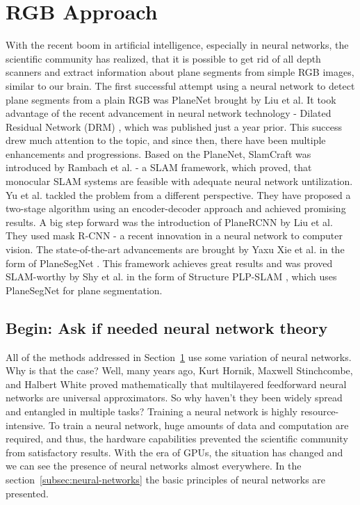 \begin{enumerate}
\end{enumerate}

\section{RGB Approach} \label{sec:rgb-approach}

With the recent boom in artificial intelligence,
especially in neural networks, the scientific community has realized,
that it is possible to get rid of all depth scanners
and extract information about plane segments from simple RGB images, similar to our brain.
The first successful attempt using a neural network to detect plane segments from a plain RGB was
PlaneNet brought by Liu et al. \cite{articlePlaneNet}
It took advantage of the recent advancement
in neural network technology - Dilated Residual Network (DRM) \cite{inproceedingsDetailedResidualNetworks},
which was published just a year prior.
This success drew much attention to the topic, and since then, there have been multiple enhancements and progressions.
Based on the PlaneNet, SlamCraft was introduced by Rambach et al. \cite{inproceedingsSlamCraft} - a SLAM framework,
which proved, that monocular SLAM systems are feasible with adequate neural network untilization.
Yu et al. \cite{inproceedingsEncoderDecoderApproach} tackled the problem from a different perspective.
They have proposed a two-stage algorithm using an encoder-decoder approach and achieved promising results.
A big step forward was the introduction of PlaneRCNN by Liu et al. \cite{articlePlaneRCNN}
They used mask R-CNN \cite{inproceedingsMaskRCNN} - a recent innovation in a neural network to computer vision.
The state-of-the-art advancements are brought by Yaxu Xie et al. in the form of PlaneSegNet \cite{inproceedingsPlaneSegNet}.
This framework achieves great results and was proved SLAM-worthy by
Shy et al. in the form of Structure PLP-SLAM \cite{inproceedingsPLPSLAM}, which uses PlaneSegNet for plane segmentation.

\subsection{Begin: Ask if needed neural network theory}

\par

All of the methods addressed in Section~\ref{sec:rgb-approach} use some variation of neural networks.
Why is that the case?
Well, many years ago, Kurt Hornik, Maxwell Stinchcombe, and Halbert White proved mathematically that multilayered feedforward neural networks are universal approximators. \cite{HORNIK1989359}
So why haven't they been widely spread and entangled in multiple tasks?
Training a neural network is highly resource-intensive.
To train a neural network, huge amounts of data and computation are required, and thus, the hardware capabilities prevented the scientific community from satisfactory results.
With the era of GPUs, the situation has changed and we can see the presence of neural networks almost everywhere.
In the section~\ref{subsec:neural-networks} the basic principles of neural networks are presented.

